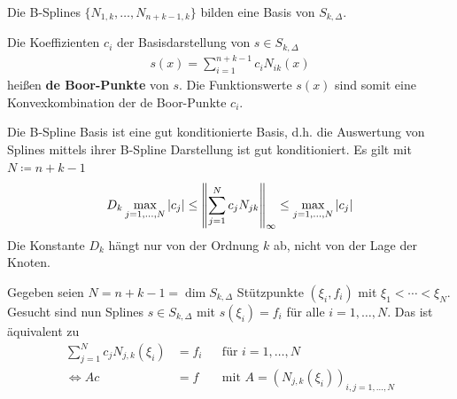 \begin{Fole}
  Die B-Splines $\{N_{1,k},\dotsc,N_{n+k-1,k}\}$ bilden eine Basis von 
  $S_{k,\Delta}$.

  Die Koeffizienten $c_i$ der Basisdarstellung von $s \in S_{k,\Delta}$
  \begin{gather*}
    s(x)=\sum_{i=1}^{n+k-1}c_iN_{ik}(x)
  \end{gather*}
  heißen \textbf{de Boor-Punkte} von $s$. 
  Die Funktionswerte $s(x)$ sind somit eine
  Konvexkombination der de Boor-Punkte $c_i$.
\end{Fole}


\begin{Beme}
  Die B-Spline Basis ist eine gut konditionierte Basis, d.h.
  die Auswertung von Splines mittels ihrer B-Spline
  Darstellung ist gut konditioniert.
  Es gilt mit $N\coloneqq n+k-1$
  \begin{gather*}
    D_k \max_{j=1,\dotsc, N} |c_j| 
    \leq \nn[\sum^N_{j=1} c_j N_{jk}]_{\infty}
    \leq \max_{j=1,\dotsc, N} | c_j|
  \end{gather*}
  Die Konstante $D_k$ hängt nur von der Ordnung $k$ ab, nicht
  von der Lage der Knoten.
\end{Beme}


\label{6.2.13}
Gegeben seien $N=n+k-1=\dim S_{k,\Delta}$ Stützpunkte $(\xi_i,f_i)$
mit $\xi_1<\dotsb<\xi_N$.
Gesucht sind nun Splines $s\in S_{k,\Delta}$ 
mit $s(\xi_i)=f_i$ für alle $i=1, \dotsc, N$.
Das ist äquivalent zu 
\begin{align}
  \sum_{j=1}^N c_jN_{j,k}(\xi_i)&=f_i &&\text{für }i=1,\dotsc, N
                                         \label{VI.2.8}
  \\\nonumber
  \Leftrightarrow Ac&=f &&\text{mit } A=(N_{j,k}(\xi_i))_{i,j=1,\dotsc,N}
\end{align}

